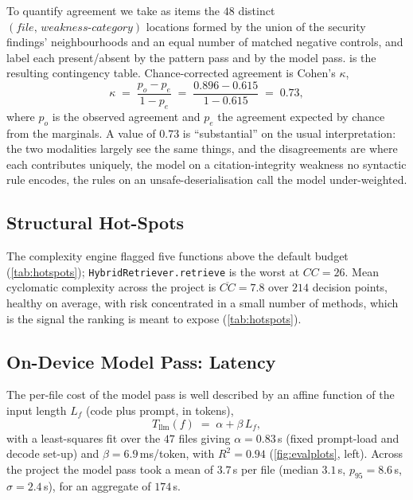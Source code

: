 To quantify agreement we take as items the $48$ distinct
$(\textit{file},\,\textit{weakness-category})$ locations formed by the
union of the security findings' neighbourhoods and an equal number of
matched negative controls, and label each present/absent by the pattern
pass and by the model pass.  is the resulting
contingency table. Chance-corrected agreement is Cohen's $\kappa$,
\begin{equation}
 \kappa \;=\; \frac{p_o - p_e}{1 - p_e}
 \;=\; \frac{0.896 - 0.615}{1 - 0.615}
 \;=\; 0.73,
 \label{eq:kappa}
\end{equation}
where $p_o$ is the observed agreement and $p_e$ the agreement expected by
chance from the marginals. A value of $0.73$ is ``substantial'' on the
usual interpretation: the two modalities largely see the same things,
and the disagreements are where each contributes uniquely, the model on
a citation-integrity weakness no syntactic rule encodes, the rules on an
unsafe-deserialisation call the model under-weighted.



\subsection{Structural Hot-Spots}
The complexity engine flagged five functions above the default budget
(\cref{tab:hotspots}); \texttt{HybridRetriever.retrieve} is the worst at
$CC=26$. Mean cyclomatic complexity across the project is
$\overline{CC}=7.8$ over $214$ decision points, healthy on average, with
risk concentrated in a small number of methods, which is the signal the
ranking is meant to expose (\cref{tab:hotspots}).

\subsection{On-Device Model Pass: Latency}
\label{sec:eval-latency}
The per-file cost of the model pass is well described by an affine
function of the input length $L_f$ (code plus prompt, in tokens),
\begin{equation}
 T_{\text{llm}}(f) \;=\; \alpha + \beta\, L_f,
 \label{eq:tllm}
\end{equation}
with a least-squares fit over the $47$ files giving $\alpha = 0.83$\,s
(fixed prompt-load and decode set-up) and $\beta = 6.9$\,ms/token, with
$R^2 = 0.94$ (\cref{fig:evalplots}, left). Across the project the model
pass took a mean of $3.7$\,s per file (median $3.1$\,s, $p_{95}=8.6$\,s,
$\sigma = 2.4$\,s), for an aggregate of $174$\,s.

